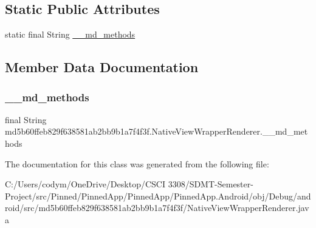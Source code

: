 \subsection*{Static Public Attributes}
\begin{DoxyCompactItemize}
\item 
static final String \hyperlink{classmd5b60ffeb829f638581ab2bb9b1a7f4f3f_1_1_native_view_wrapper_renderer_a547a83f65da27218233c777a2e72959f}{\+\_\+\+\_\+md\+\_\+methods}
\end{DoxyCompactItemize}


\subsection{Member Data Documentation}
\mbox{\label{classmd5b60ffeb829f638581ab2bb9b1a7f4f3f_1_1_native_view_wrapper_renderer_a547a83f65da27218233c777a2e72959f}} 
\subsubsection{\texorpdfstring{\+\_\+\+\_\+md\+\_\+methods}{\_\_md\_methods}}
{\footnotesize\ttfamily final String md5b60ffeb829f638581ab2bb9b1a7f4f3f.\+Native\+View\+Wrapper\+Renderer.\+\_\+\+\_\+md\+\_\+methods\hspace{0.3cm}{\ttfamily [static]}}



The documentation for this class was generated from the following file\+:\begin{DoxyCompactItemize}
\item 
C\+:/\+Users/codym/\+One\+Drive/\+Desktop/\+C\+S\+C\+I 3308/\+S\+D\+M\+T-\/\+Semester-\/\+Project/src/\+Pinned/\+Pinned\+App/\+Pinned\+App/\+Pinned\+App.\+Android/obj/\+Debug/android/src/md5b60ffeb829f638581ab2bb9b1a7f4f3f/Native\+View\+Wrapper\+Renderer.\+java\end{DoxyCompactItemize}

